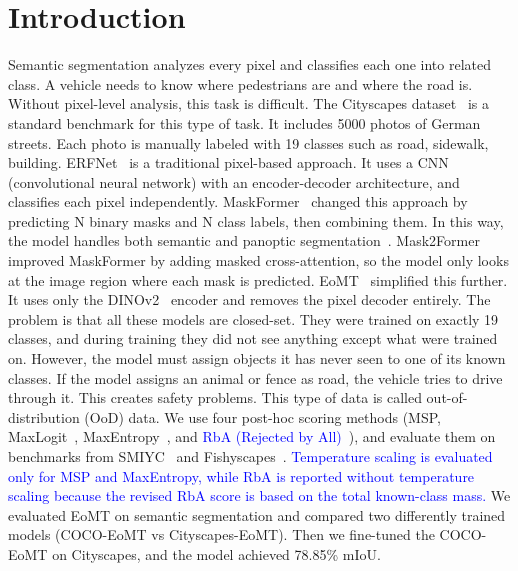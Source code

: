 \section{Introduction}
\label{sec:intro}

Semantic segmentation analyzes every pixel and classifies each one into related class. 
A vehicle needs to know where pedestrians are and where the road is. Without pixel-level analysis, this task is difficult. 
The Cityscapes dataset~\cite{cityscapes} is a standard benchmark for this type of task. It includes 5000 photos of German streets. 
Each photo is manually labeled with 19 classes such as road, sidewalk, building.
ERFNet~\cite{erfnet} is a traditional pixel-based approach. 
It uses a CNN (convolutional neural network) with an encoder-decoder architecture, and classifies each pixel independently.
MaskFormer~\cite{maskformer} changed this approach by predicting N binary masks and N class labels, then combining them. 
In this way, the model handles both semantic and panoptic segmentation~\cite{panoptic}. 
Mask2Former~\cite{mask2former} improved MaskFormer by adding masked cross-attention, so the model only looks at the image region where each mask is predicted. 
EoMT~\cite{eomt} simplified this further. It uses only the DINOv2~\cite{dinov2} encoder and removes the pixel decoder entirely.
The problem is that all these models are closed-set. 
They were trained on exactly 19 classes, and during training they did not see anything except what were trained on. 
However, the model must assign objects it has never seen to one of its known classes. 
If the model assigns an animal or fence as road, the vehicle tries to drive through it. This creates safety problems. 
This type of data is called out-of-distribution (OoD) data. 
We use four post-hoc scoring methods (MSP, MaxLogit~\cite{maxlogit}, MaxEntropy~\cite{maxentropy}, and \textcolor{blue}{RbA (Rejected by All)~\cite{rba}}), and evaluate them on benchmarks from SMIYC~\cite{smiyc} and Fishyscapes~\cite{fishyscapes}. \textcolor{blue}{Temperature scaling is evaluated only for MSP and MaxEntropy, while RbA is reported without temperature scaling because the revised RbA score is based on the total known-class mass.}
We evaluated EoMT on semantic segmentation and compared two differently trained models (COCO-EoMT vs Cityscapes-EoMT).
Then we fine-tuned the COCO-EoMT on Cityscapes, and the model achieved 78.85\% mIoU. 
